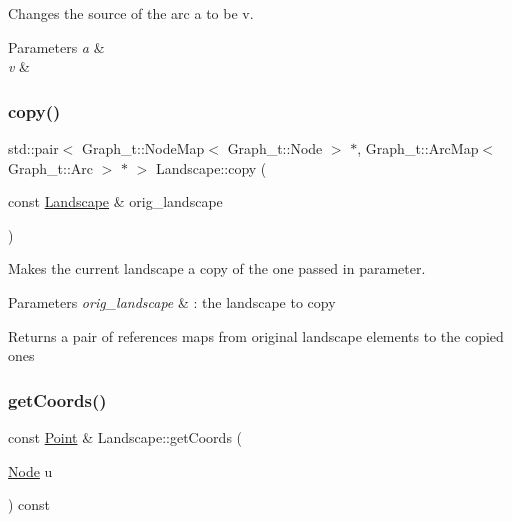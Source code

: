 Changes the source of the arc a to be v. 


\begin{DoxyParams}{Parameters}
{\em a} & \\
\hline
{\em v} & \\
\hline
\end{DoxyParams}
\mbox{\label{class_landscape_a72ac309bcc23cf55888967b4da22ad6f}} 
\subsubsection{\texorpdfstring{copy()}{copy()}}
{\footnotesize\ttfamily std\+::pair$<$ Graph\+\_\+t\+::\+Node\+Map$<$ Graph\+\_\+t\+::\+Node $>$ $\ast$, Graph\+\_\+t\+::\+Arc\+Map$<$ Graph\+\_\+t\+::\+Arc $>$ $\ast$ $>$ Landscape\+::copy (\begin{DoxyParamCaption}\item[{const \hyperlink{class_landscape}{Landscape} \&}]{orig\+\_\+landscape }\end{DoxyParamCaption})}



Makes the current landscape a copy of the one passed in parameter. 


\begin{DoxyParams}{Parameters}
{\em orig\+\_\+landscape} & \+: the landscape to copy \\
\hline
\end{DoxyParams}
\begin{DoxyReturn}{Returns}
a pair of references maps from original landscape elements to the copied ones 
\end{DoxyReturn}
\mbox{\label{class_landscape_a99f206e722c06b938fe1f2e105de310d}} 
\subsubsection{\texorpdfstring{get\+Coords()}{getCoords()}}
{\footnotesize\ttfamily const \hyperlink{abstract__landscape_8hpp_a9c14bcba65b035519a9c98f1eb1babbe}{Point} \& Landscape\+::get\+Coords (\begin{DoxyParamCaption}\item[{\hyperlink{classconcepts_1_1_abstract_landscape_a7c2f90fb9f42302f1af84a59f4df4b91}{Node}}]{u }\end{DoxyParamCaption}) const}

